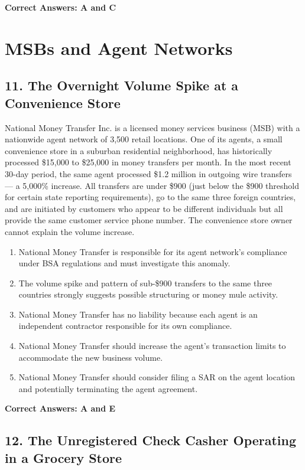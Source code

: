 \documentclass[11pt,a4paper]{article}
\begin{document}
	\textbf{Correct Answers: A and C}
	
	\section{MSBs and Agent Networks}
	
	\subsection{11. The Overnight Volume Spike at a Convenience Store}
	
	National Money Transfer Inc. is a licensed money services business (MSB) with a nationwide agent network of 3,500 retail locations. One of its agents, a small convenience store in a suburban residential neighborhood, has historically processed \$15,000 to \$25,000 in money transfers per month. In the most recent 30-day period, the same agent processed \$1.2 million in outgoing wire transfers — a 5,000\% increase. All transfers are under \$900 (just below the \$900 threshold for certain state reporting requirements), go to the same three foreign countries, and are initiated by customers who appear to be different individuals but all provide the same customer service phone number. The convenience store owner cannot explain the volume increase.
	
	\begin{enumerate}[label=\Alph*.]
		\item National Money Transfer is responsible for its agent network's compliance under BSA regulations and must investigate this anomaly.
		\item The volume spike and pattern of sub-\$900 transfers to the same three countries strongly suggests possible structuring or money mule activity.
		\item National Money Transfer has no liability because each agent is an independent contractor responsible for its own compliance.
		\item National Money Transfer should increase the agent's transaction limits to accommodate the new business volume.
		\item National Money Transfer should consider filing a SAR on the agent location and potentially terminating the agent agreement.
	\end{enumerate}
	
	\textbf{Correct Answers: A and E}
	
	\subsection{12. The Unregistered Check Casher Operating in a Grocery Store}
	
\end{document}
